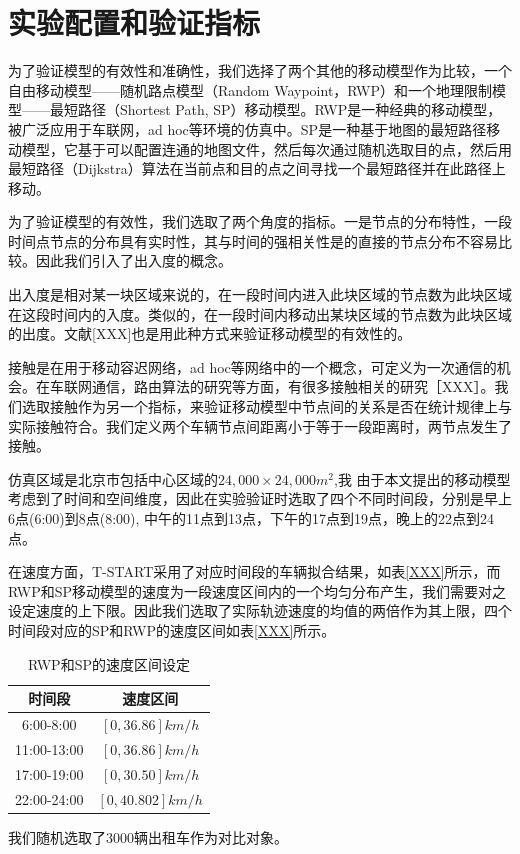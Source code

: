 \section{实验配置和验证指标}

为了验证模型的有效性和准确性，我们选择了两个其他的移动模型作为比较，一个自由移动模型——随机路点模型（Random Waypoint，RWP）和一个地理限制模型——最短路径（Shortest Path, SP）移动模型。RWP是一种经典的移动模型，被广泛应用于车联网，ad hoc等环境的仿真中。SP是一种基于地图的最短路径移动模型，它基于可以配置连通的地图文件，然后每次通过随机选取目的点，然后用最短路径（Dijkstra）算法在当前点和目的点之间寻找一个最短路径并在此路径上移动。

为了验证模型的有效性，我们选取了两个角度的指标。一是节点的分布特性，一段时间点节点的分布具有实时性，其与时间的强相关性是的直接的节点分布不容易比较。因此我们引入了出入度的概念。

出入度是相对某一块区域来说的，在一段时间内进入此块区域的节点数为此块区域在这段时间内的入度。类似的，在一段时间内移动出某块区域的节点数为此块区域的出度。文献[XXX]也是用此种方式来验证移动模型的有效性的。

接触是在用于移动容迟网络，ad hoc等网络中的一个概念，可定义为一次通信的机会。在车联网通信，路由算法的研究等方面，有很多接触相关的研究［XXX］。我们选取接触作为另一个指标，来验证移动模型中节点间的关系是否在统计规律上与实际接触符合。我们定义两个车辆节点间距离小于等于一段距离时，两节点发生了接触。

仿真区域是北京市包括中心区域的$24,000\times 24,000m^2$,我
由于本文提出的移动模型考虑到了时间和空间维度，因此在实验验证时选取了四个不同时间段，分别是早上6点(6:00)到8点(8:00), 中午的11点到13点，下午的17点到19点，晚上的22点到24点。

在速度方面，T-START采用了对应时间段的车辆拟合结果，如表\ref{XXX}所示，而RWP和SP移动模型的速度为一段速度区间内的一个均匀分布产生，我们需要对之设定速度的上下限。因此我们选取了实际轨迹速度的均值的两倍作为其上限，四个时间段对应的SP和RWP的速度区间如表\ref{XXX}所示。
\begin{table}
\centering
\caption{RWP和SP的速度区间设定}
\begin{tabular}{cc}
\hline
\hline
  时间段& 速度区间 \\
  \hline
6:00-8:00  & $[0, 36.86]km/h$ \\
11:00-13:00  &  $[0, 36.86]km/h$\\
17:00-19:00 &  $[0, 30.50]km/h$\\
22:00-24:00  & $[0, 40.802]km/h$\\
\hline
\end{tabular}
\end{table}
我们随机选取了3000辆出租车作为对比对象。

